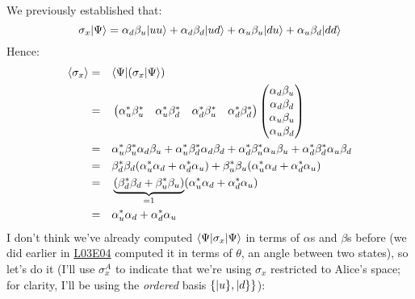 \documentclass[solutions.tex]{subfiles}
\begin{document}
We previously established that:
\[
	\sigma_x|\Psi\rangle = \alpha_d\beta_u|uu\rangle + \alpha_d\beta_d|ud\rangle
		+\alpha_u\beta_u|du\rangle+ \alpha_u\beta_d|dd\rangle
\]
Hence:
\begin{equation*}\begin{aligned}
	\left\langle \sigma_x \right\rangle &=&& \langle \Psi|(\sigma_x|\Psi\rangle) \\
	~ &=&& \begin{pmatrix}
		\alpha_u^*\beta_u^* & \alpha_u^*\beta_d^* &
		\alpha_d^*\beta_u^* & \alpha_d^*\beta_d^* \\
	\end{pmatrix}\begin{pmatrix}
		\alpha_d\beta_u \\
		\alpha_d\beta_d \\
		\alpha_u\beta_u \\
		\alpha_u\beta_d \\
	\end{pmatrix} \\
	~ &=&& 	\alpha_u^*\beta_u^*\alpha_d\beta_u
		+ \alpha_u^*\beta_d^*\alpha_d\beta_d
		+ \alpha_d^*\beta_u^*\alpha_u\beta_u
		+ \alpha_d^*\beta_d^*\alpha_u\beta_d \\
	~ &=&&\beta_d^*\beta_d(\alpha_u^*\alpha_d+\alpha_d^*\alpha_u)
		+ \beta_u^*\beta_u(\alpha_u^*\alpha_d+\alpha_d^*\alpha_u) \\
	~ &=&&\underbrace{(\beta_d^*\beta_d+\beta_u^*\beta_u)}_{=1}
		(\alpha_u^*\alpha_d+\alpha_d^*\alpha_u) \\
	~ &=&& \alpha_u^*\alpha_d+\alpha_d^*\alpha_u \\
\end{aligned}\end{equation*}
I don't think we've already computed $\langle \Psi|\sigma_x|\Psi\rangle$
in terms of $\alpha$s and $\beta$s before (we did earlier
in \href{https://github.com/mbivert/ttm/blob/master/qm/L03E04.pdf}{L03E04}
computed it in terms of $\theta$, an angle between two states), so
let's do it (I'll use $\sigma_x^A$ to indicate that we're using
$\sigma_x$ restricted to Alice's space; for clarity, I'll be
using the \textit{ordered} basis $\{|u\}, |d\}\}$):
\end{document}
